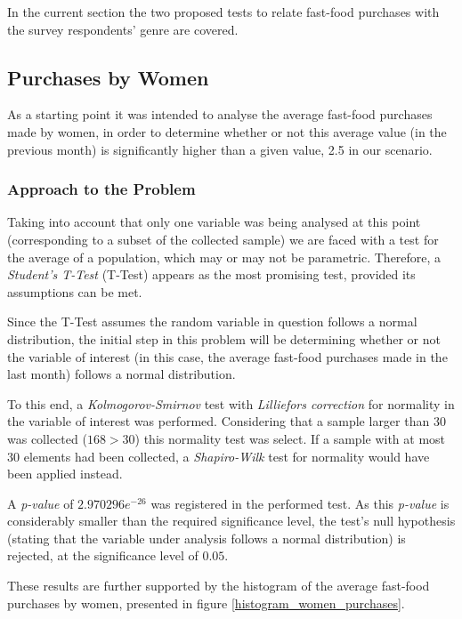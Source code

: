 \documentclass[12pt]{article}
\begin{document}
In the current section the two proposed tests to relate fast-food purchases with the survey respondents' genre are covered.

\subsection{Purchases by Women}

As a starting point it was intended to analyse the average fast-food purchases made by women, in order to determine whether or not this average value (in the previous month) is significantly higher than a given value, 2.5 in our scenario.

\subsubsection{Approach to the Problem}

Taking into account that only one variable was being analysed at this point (corresponding to a subset of the collected sample) we are faced with a test for the average of a population, which may or may not be parametric. Therefore, a \emph{Student's T-Test} (T-Test) appears as the most promising test, provided its assumptions can be met.

Since the T-Test assumes the random variable in question follows a normal distribution, the initial step in this problem will be determining whether or not the variable of interest (in this case, the average fast-food purchases made in the last month) follows a normal distribution.

To this end, a \emph{Kolmogorov-Smirnov} test with \emph{Lilliefors correction} for normality in the variable of interest was performed. Considering that a sample larger than $30$ was collected ($168 > 30$) this normality test was select. If a sample with at most $30$ elements had been collected, a \emph{Shapiro-Wilk} test for normality would have been applied instead.

A \emph{p-value} of $2.970296e^{-26}$ was registered in the performed test. As this \emph{p-value} is considerably smaller than the required significance level, the test's null hypothesis (stating that the variable under analysis follows a normal distribution) is rejected, at the significance level of $0.05$.

These results are further supported by the histogram of the average fast-food purchases by women, presented in figure \ref{histogram_women_purchases}.
\end{document}
